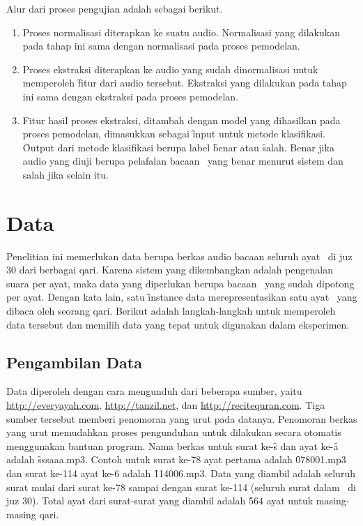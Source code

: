 Alur dari proses pengujian adalah sebagai berikut.
\begin{enumerate}
  \item Proses normalisasi diterapkan ke suatu audio. Normalisasi yang dilakukan pada tahap ini sama dengan normalisasi pada proses pemodelan.
  \item Proses ekstraksi diterapkan ke audio yang sudah dinormalisasi untuk memperoleh \f{fitur} dari audio tersebut. Ekstraksi yang dilakukan pada tahap ini sama dengan ekstraksi pada proses pemodelan.
  \item Fitur hasil proses ekstraksi, ditambah dengan model yang dihasilkan pada proses pemodelan, dimasukkan sebagai \f{input} untuk metode klasifikasi. \f{Output} dari metode klasifikasi berupa label \f{benar} atau \f{salah}. Benar jika audio yang diuji berupa pelafalan bacaan \quran~yang benar menurut sistem dan salah jika selain itu.
\end{enumerate}



\section{Data}
Penelitian ini memerlukan data berupa berkas audio bacaan seluruh ayat \quran~di juz 30 dari berbagai qari. Karena sistem yang dikembangkan adalah pengenalan suara per ayat, maka data yang diperlukan berupa bacaan \quran~yang sudah dipotong per ayat. Dengan kata lain, satu \f{instance} data merepresentasikan satu ayat \quran~yang dibaca oleh seorang qari. Berikut adalah langkah-langkah untuk memperoleh data tersebut dan memilih data yang tepat untuk digunakan dalam eksperimen.

  \subsection{Pengambilan Data} \label{pengambilan data}
  Data diperoleh dengan cara mengunduh dari beberapa sumber, yaitu \url{http://everyayah.com}, \url{http://tanzil.net}, dan \url{http://recitequran.com}. Tiga sumber tersebut memberi penomoran yang urut pada datanya. Penomoran berkas yang urut memudahkan proses pengunduhan untuk dilakukan secara otomatis menggunakan bantuan program. Nama berkas untuk surat ke-\f{s} dan ayat ke-\f{a} adalah \f{sssaaa.mp3}. Contoh untuk surat ke-78 ayat pertama adalah \f{078001.mp3} dan surat ke-114 ayat ke-6 adalah \f{114006.mp3}. Data yang diambil adalah seluruh surat mulai dari surat ke-78 sampai dengan surat ke-114 (seluruh surat dalam \quran~di juz 30). Total ayat dari surat-surat yang diambil adalah 564 ayat untuk masing-masing qari.

